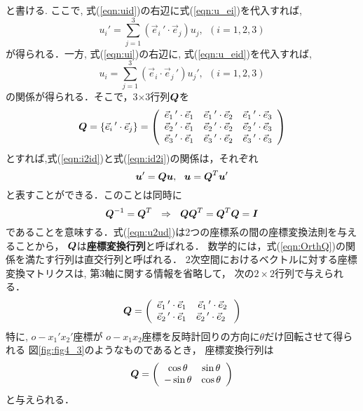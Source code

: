 \documentclass[10pt,a4j]{jbook}
\begin{document}
と書ける. ここで, 式(\ref{eqn:uid})の右辺に式(\ref{eqn:u_ei})を代入すれば, 
\begin{equation}
	u_i'=\sum_{j=1}^3 (\vec{e}_i\,'\cdot \vec{e}_j) u_j , \ \ (i=1,2,3)
	\label{eqn:i2id}
\end{equation}
が得られる．一方, 式(\ref{eqn:ui})の右辺に, 式(\ref{eqn:u_eid})を代入すれば, 
\begin{equation}
	u_i=\sum_{j=1}^3 (\vec{e}_i\cdot \vec{e}_j\, ') u_j', \ \ (i=1,2,3) 
	\label{eqn:id2i}
\end{equation}
の関係が得られる．そこで，3$\times$3行列$\mbox{\boldmath $Q$}$を
\begin{equation}
	\mbox{\boldmath $Q$}=
	\left\{
		\vec{e}_i\,'\cdot \vec{e}_j
	\right\}
	=
	\left( 
	\begin{array}{ccc}
		\vec{e}_1\,'\cdot \vec{e}_1 & \vec{e}_1\,'\cdot \vec{e}_2 & \vec{e}_1\,'\cdot \vec{e}_3 \\
		\vec{e}_2\,'\cdot \vec{e}_1 & \vec{e}_2\,'\cdot \vec{e}_2 & \vec{e}_2\,'\cdot \vec{e}_3 \\
		\vec{e}_3\,'\cdot \vec{e}_1 & \vec{e}_3\,'\cdot \vec{e}_2 & \vec{e}_3\,'\cdot \vec{e}_3 
	\end{array}
	\right)
	\label{eqn:defQ}
\end{equation}
とすれば,式(\ref{eqn:i2id})と式(\ref{eqn:id2i})の関係は，それぞれ 
\begin{equation}
	\fat{u}'=\fat{Q}\fat{u}, \ \ 
	\fat{u}=\fat{Q}^T\fat{u}'
	\label{eqn:u2ud}
\end{equation}
と表すことができる．このことは同時に
\begin{equation}
	\fat{Q}^{-1}=\fat{Q}^{T} \ \ \Rightarrow \ \ \fat{QQ}^T=\fat{Q}^T\fat{Q}=\fat{I}
	\label{eqn:OrthQ}
\end{equation}
であることを意味する．式(\ref{eqn:u2ud})は2つの座標系の間の座標変換法則を与えることから，
$\mbox{\boldmath $Q$}$は{\bf 座標変換行列}と呼ばれる．
数学的には，式(\ref{eqn:OrthQ})の関係を満たす行列は直交行列と呼ばれる．
2次空間におけるベクトルに対する座標変換マトリクスは, 第3軸に関する情報を省略して，
次の$2\times 2$行列で与えられる．
\begin{equation}
	\mbox{\boldmath $Q$}=
	\left( 
	\begin{array}{cc}
		\vec{e}_1\,'\cdot \vec{e}_1 & \vec{e}_1\,'\cdot \vec{e}_2 \\
		\vec{e}_2\,'\cdot \vec{e}_1 & \vec{e}_2\,'\cdot \vec{e}_2 \
	\end{array}
	\right)
\end{equation}
特に, 
$o-x_1'x_2'$座標が $o-x_1x_2$座標を反時計回りの方向に$\theta$だけ回転させて得られる
図\ref{fig:fig4_3}のようなものであるとき，
座標変換行列は
\begin{equation}
	\mbox{\boldmath $Q$}=
	\left( 
	\begin{array}{cc}
		 \cos \theta & \sin \theta \\
		-\sin \theta & \cos \theta 
	\end{array}
	\right)
	\label{eqn:Qth}
\end{equation}
と与えられる．
\end{document}
